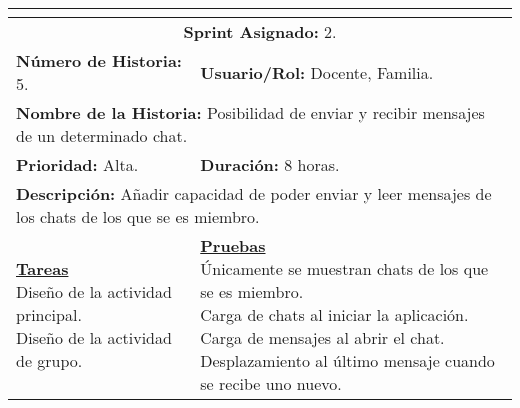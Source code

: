 \resizebox{15cm}{!} {
	\begin{tabular}{|l|l|}
		\hline
		\multicolumn{2}{|c|}{\cellcolor[HTML]{343434}{\color[HTML]{FFFFFF} \textbf{Historia de Usuario}}} \\
		\hline
		\multicolumn{2}{|c|}{\textbf{Sprint Asignado:} 2.} \\
		\hline
		\textbf{Número de Historia:} 5. & \textbf{Usuario/Rol:} Docente, Familia.\\
		\hline
		\multicolumn{2}{|l|}{\textbf{Nombre de la Historia:} Posibilidad de enviar y recibir mensajes de un determinado chat.} \\
		\hline
		\textbf{Prioridad:} Alta. & \textbf{Duración:} 8 horas.\\
		\hline
		\multicolumn{2}{|l|}{\textbf{Descripción:} Añadir capacidad de poder enviar y leer mensajes de los chats de los que se es miembro.} \\
		\hline
		\specialcell{\underline{\textbf{Tareas}} \\ Diseño de la actividad principal. \\ Diseño de la actividad de grupo.} & \specialcell{\underline{\textbf{Pruebas}} \\ Únicamente se muestran chats de los que se es miembro. \\ Carga de chats al iniciar la aplicación. \\ Carga de mensajes al abrir el chat. \\ Desplazamiento al último mensaje cuando se recibe uno nuevo.} \\
		\hline
	\end{tabular}
}
